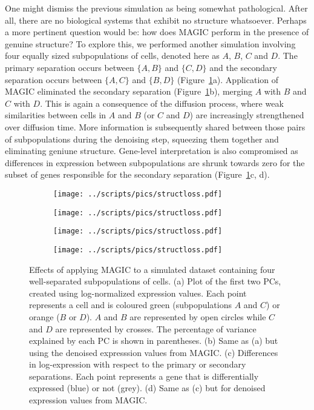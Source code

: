 \documentclass[10pt,letterpaper]{article}
\begin{document}
One might dismiss the previous simulation as being somewhat pathological.
After all, there are no biological systems that exhibit no structure whatsoever.
Perhaps a more pertinent question would be: how does MAGIC perform in the presence of genuine structure? 
To explore this, we performed another simulation involving four equally sized subpopulations of cells, denoted here as $A$, $B$, $C$ and $D$.
The primary separation occurs between $\{A, B\}$ and $\{C, D\}$ and the secondary separation occurs between $\{A, C\}$ and $\{B, D\}$ (Figure~\ref{fig:fourclusters}a).
Application of MAGIC eliminated the secondary separation (Figure~\ref{fig:fourclusters}b), merging $A$ with $B$ and $C$ with $D$.
This is again a consequence of the diffusion process, where weak similarities between cells in $A$ and $B$ (or $C$ and $D$) are increasingly strengthened over diffusion time.
More information is subsequently shared between those pairs of subpopulations during the denoising step, squeezing them together and eliminating geniune structure.
Gene-level interpretation is also compromised as differences in expression between subpopulations are shrunk towards zero for the subset of genes responsible for the secondary separation (Figure~\ref{fig:fourclusters}c, d).

\begin{figure}[btp]
\centering
\begin{subfigure}[b]{0.49\textwidth}
    \texttt{[image: ../scripts/pics/structloss.pdf]}
    \caption{}
\end{subfigure}
\begin{subfigure}[b]{0.49\textwidth}
    \texttt{[image: ../scripts/pics/structloss.pdf]}
    \caption{}
\end{subfigure}
\begin{subfigure}[b]{0.49\textwidth}
    \texttt{[image: ../scripts/pics/structloss.pdf]}
    \caption{}
\end{subfigure}
\begin{subfigure}[b]{0.49\textwidth}
    \texttt{[image: ../scripts/pics/structloss.pdf]}
    \caption{}
\end{subfigure}
\caption{Effects of applying MAGIC to a simulated dataset containing four well-separated subpopulations of cells.
(a) Plot of the first two PCs, created using log-normalized expression values.
Each point represents a cell and is coloured green (subpopulations $A$ and $C$) or orange ($B$ or $D$).
$A$ and $B$ are represented by open circles while $C$ and $D$ are represented by crosses.
The percentage of variance explained by each PC is shown in parentheses.
(b) Same as (a) but using the denoised expresssion values from MAGIC.
(c) Differences in log-expression with respect to the primary or secondary separations.
Each point represents a gene that is differentially expressed (blue) or not (grey).
(d) Same as (c) but for denoised expression values from MAGIC.}
\label{fig:fourclusters}
\end{figure}
\end{document}
